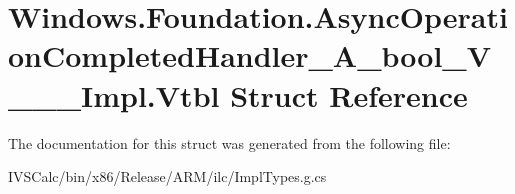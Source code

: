 \hypertarget{struct_windows_1_1_foundation_1_1_async_operation_completed_handler___a__bool___v_______impl_1_1_vtbl}{}\section{Windows.\+Foundation.\+Async\+Operation\+Completed\+Handler\+\_\+\+A\+\_\+bool\+\_\+\+V\+\_\+\+\_\+\+\_\+\+Impl.\+Vtbl Struct Reference}
\label{struct_windows_1_1_foundation_1_1_async_operation_completed_handler___a__bool___v_______impl_1_1_vtbl}


The documentation for this struct was generated from the following file\+:\begin{DoxyCompactItemize}
\item 
I\+V\+S\+Calc/bin/x86/\+Release/\+A\+R\+M/ilc/Impl\+Types.\+g.\+cs\end{DoxyCompactItemize}

